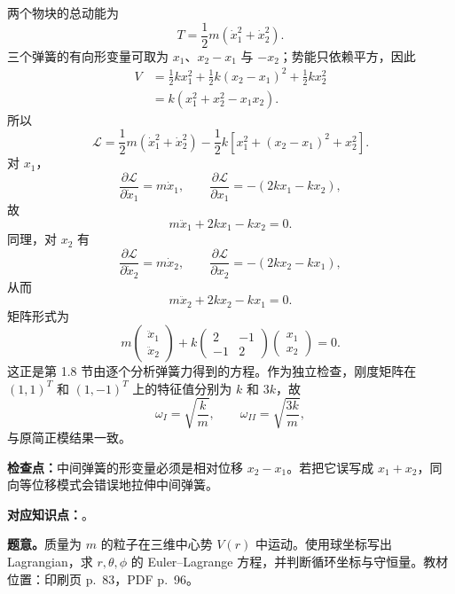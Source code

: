 \begin{checkedsolution}
两个物块的总动能为
\begin{equation*}
  T=\frac12m(\dot x_1^2+\dot x_2^2).
\end{equation*}
三个弹簧的有向形变量可取为 $x_1$、$x_2-x_1$ 与 $-x_2$；势能只依赖平方，因此
\begin{align*}
  V
  &=\frac12kx_1^2
    +\frac12k(x_2-x_1)^2
    +\frac12kx_2^2\\
  &=k(x_1^2+x_2^2-x_1x_2).
\end{align*}
所以
\begin{equation}
  \mathcal L
  =\frac12m(\dot x_1^2+\dot x_2^2)
  -\frac12k\left[x_1^2+(x_2-x_1)^2+x_2^2\right].
  \label{eq:QM-C02-S01-E02-lagrangian}
\end{equation}
对 $x_1$，
\[
  \frac{\partial\mathcal L}{\partial\dot x_1}=m\dot x_1,
  \qquad
  \frac{\partial\mathcal L}{\partial x_1}=-(2kx_1-kx_2),
\]
故
\[
  m\ddot x_1+2kx_1-kx_2=0.
\]
同理，对 $x_2$ 有
\[
  \frac{\partial\mathcal L}{\partial\dot x_2}=m\dot x_2,
  \qquad
  \frac{\partial\mathcal L}{\partial x_2}=-(2kx_2-kx_1),
\]
从而
\[
  m\ddot x_2+2kx_2-kx_1=0.
\]
矩阵形式为
\begin{equation}
  \boxed{
  m\begin{pmatrix}\ddot x_1\\\ddot x_2\end{pmatrix}
  +k\begin{pmatrix}2&-1\\-1&2\end{pmatrix}
  \begin{pmatrix}x_1\\x_2\end{pmatrix}=0.}
  \label{eq:QM-C02-S01-E02-coupled-equations}
\end{equation}
这正是第 1.8 节由逐个分析弹簧力得到的方程。作为独立检查，刚度矩阵在 $(1,1)^T$ 和 $(1,-1)^T$ 上的特征值分别为 $k$ 和 $3k$，故
\[
  \omega_I=\sqrt{\frac{k}{m}},
  \qquad
  \omega_{II}=\sqrt{\frac{3k}{m}},
\]
与原简正模结果一致。
\end{checkedsolution}

\textbf{检查点：}中间弹簧的形变量必须是相对位移 $x_2-x_1$。若把它误写成 $x_1+x_2$，同向等位移模式会错误地拉伸中间弹簧。


\textbf{对应知识点：}。

\textbf{题意。}质量为 $m$ 的粒子在三维中心势 $V(r)$ 中运动。使用球坐标写出 Lagrangian，求 $r,\theta,\phi$ 的 Euler--Lagrange 方程，并判断循环坐标与守恒量。教材位置：印刷页 p.~83，PDF p.~96。

